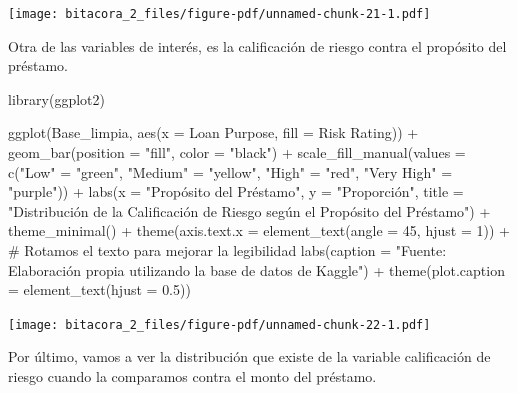 \documentclass[
  letterpaper,
  DIV=11,
  numbers=noendperiod]{scrreprt}
\newenvironment{Shaded}{\begin{snugshade}}{\end{snugshade}}
\newcommand{\AttributeTok}[1]{\textcolor[rgb]{0.40,0.45,0.13}{#1}}
\newcommand{\CommentTok}[1]{\textcolor[rgb]{0.37,0.37,0.37}{#1}}
\newcommand{\DecValTok}[1]{\textcolor[rgb]{0.68,0.00,0.00}{#1}}
\newcommand{\FloatTok}[1]{\textcolor[rgb]{0.68,0.00,0.00}{#1}}
\newcommand{\FunctionTok}[1]{\textcolor[rgb]{0.28,0.35,0.67}{#1}}
\newcommand{\NormalTok}[1]{\textcolor[rgb]{0.00,0.23,0.31}{#1}}
\newcommand{\OtherTok}[1]{\textcolor[rgb]{0.00,0.23,0.31}{#1}}
\newcommand{\SpecialCharTok}[1]{\textcolor[rgb]{0.37,0.37,0.37}{#1}}
\newcommand{\StringTok}[1]{\textcolor[rgb]{0.13,0.47,0.30}{#1}}
\begin{document}
\texttt{[image: bitacora\_2\_files/figure-pdf/unnamed-chunk-21-1.pdf]}

Otra de las variables de interés, es la calificación de riesgo contra el
propósito del préstamo.

\begin{Shaded}
\begin{Highlighting}[]
\FunctionTok{library}\NormalTok{(ggplot2)}

\FunctionTok{ggplot}\NormalTok{(Base\_limpia, }\FunctionTok{aes}\NormalTok{(}\AttributeTok{x =} \StringTok{\textasciigrave{}}\AttributeTok{Loan Purpose}\StringTok{\textasciigrave{}}\NormalTok{, }\AttributeTok{fill =} \StringTok{\textasciigrave{}}\AttributeTok{Risk Rating}\StringTok{\textasciigrave{}}\NormalTok{)) }\SpecialCharTok{+}  
  \FunctionTok{geom\_bar}\NormalTok{(}\AttributeTok{position =} \StringTok{"fill"}\NormalTok{, }\AttributeTok{color =} \StringTok{"black"}\NormalTok{) }\SpecialCharTok{+}  
  \FunctionTok{scale\_fill\_manual}\NormalTok{(}\AttributeTok{values =} \FunctionTok{c}\NormalTok{(}\StringTok{"Low"} \OtherTok{=} \StringTok{"green"}\NormalTok{, }\StringTok{"Medium"} \OtherTok{=} \StringTok{"yellow"}\NormalTok{, }\StringTok{"High"} \OtherTok{=} \StringTok{"red"}\NormalTok{, }\StringTok{"Very High"} \OtherTok{=} \StringTok{"purple"}\NormalTok{)) }\SpecialCharTok{+}  
  \FunctionTok{labs}\NormalTok{(}\AttributeTok{x =} \StringTok{"Propósito del Préstamo"}\NormalTok{, }\AttributeTok{y =} \StringTok{"Proporción"}\NormalTok{, }\AttributeTok{title =} \StringTok{"Distribución de la Calificación de Riesgo según el Propósito del Préstamo"}\NormalTok{) }\SpecialCharTok{+} 
  \FunctionTok{theme\_minimal}\NormalTok{() }\SpecialCharTok{+}
  \FunctionTok{theme}\NormalTok{(}\AttributeTok{axis.text.x =} \FunctionTok{element\_text}\NormalTok{(}\AttributeTok{angle =} \DecValTok{45}\NormalTok{, }\AttributeTok{hjust =} \DecValTok{1}\NormalTok{)) }\SpecialCharTok{+} \CommentTok{\# Rotamos el texto para mejorar la legibilidad}
  \FunctionTok{labs}\NormalTok{(}\AttributeTok{caption =} \StringTok{"Fuente: Elaboración propia utilizando la base de datos de Kaggle"}\NormalTok{) }\SpecialCharTok{+}
\FunctionTok{theme}\NormalTok{(}\AttributeTok{plot.caption =} \FunctionTok{element\_text}\NormalTok{(}\AttributeTok{hjust =} \FloatTok{0.5}\NormalTok{)) }
\end{Highlighting}
\end{Shaded}

\texttt{[image: bitacora\_2\_files/figure-pdf/unnamed-chunk-22-1.pdf]}

Por último, vamos a ver la distribución que existe de la variable
calificación de riesgo cuando la comparamos contra el monto del
préstamo.
\end{document}
